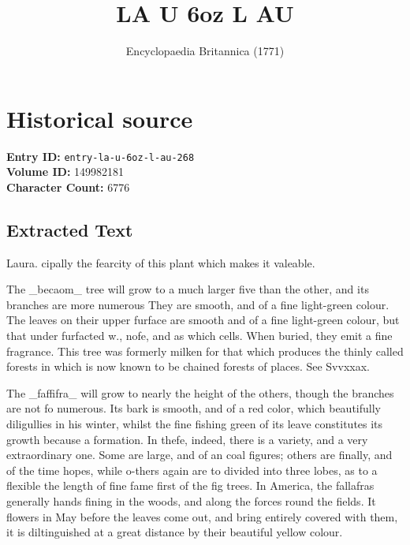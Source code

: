 \documentclass{article}
\title{LA U  6oz  L AU}
\date{Encyclopaedia Britannica (1771)}
\begin{document}
\maketitle

\section*{Historical source}
\textbf{Entry ID:} \texttt{entry-la-u-6oz-l-au-268} \\
\textbf{Volume ID:} 149982181 \\
\textbf{Character Count:} 6776

\subsection*{Extracted Text}
Laura. cipally the fearcity of this plant which makes it valeable.

The \_becaom\_ tree will grow to a much larger five than the other, and its branches are more numerous They are smooth, and of a fine light-green colour. The leaves on their upper furface are smooth and of a fine light-green colour, but that under furfacted w., nofe, and as which cells. When buried, they emit a fine fragrance. This tree was formerly milken for that which produces the thinly called forests in which is now known to be chained forests of places. See Svvxxax.

The \_faffifra\_ will grow to nearly the height of the others, though the branches are not fo numerous. Its bark is smooth, and of a red color, which beautifully diligullies in his winter, whilst the fine fishing green of its leave constitutes its growth because a formation. In thefe, indeed, there is a variety, and a very extraordinary one. Some are large, and of an coal figures; others are finally, and of the time hopes, while o-thers again are to divided into three lobes, as to a flexible the length of fine fame first of the fig trees. In America, the fallafras generally hands fining in the woods, and along the forces round the fields. It flowers in May before the leaves come out, and bring entirely covered with them, it is diltinguished at a great distance by their beautiful yellow colour.
\end{document}
